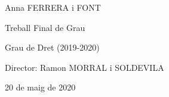 \documentclass[12pt]{article}
\begin{document}
\vspace{\baselineskip}

\vspace{\baselineskip}

\vspace{\baselineskip}

\vspace{\baselineskip}

\vspace{\baselineskip}

\vspace{\baselineskip}

\vspace{\baselineskip}

\vspace{\baselineskip}

\vspace{\baselineskip}

\vspace{\baselineskip}
\begin{Center}
Anna FERRERA i FONT
\end{Center}\par


\vspace{\baselineskip}
\begin{Center}
Treball Final de Grau 
\end{Center}\par


\vspace{\baselineskip}
\begin{Center}
Grau de Dret (2019-2020)
\end{Center}\par


\vspace{\baselineskip}
\begin{Center}
Director: Ramon MORRAL i SOLDEVILA
\end{Center}\par


\vspace{\baselineskip}
\begin{Center}
20 de maig de 2020
\end{Center}\par


\vspace{\baselineskip}

\vspace{\baselineskip}

\vspace{\baselineskip}
\end{document}

